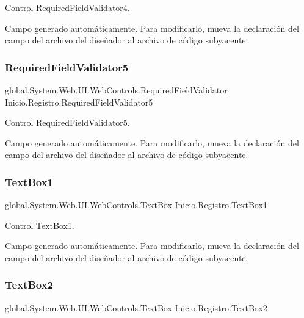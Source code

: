 Control Required\+Field\+Validator4. 

Campo generado automáticamente. Para modificarlo, mueva la declaración del campo del archivo del diseñador al archivo de código subyacente. \mbox{\label{class_inicio_1_1_registro_af4f83864caf67319997d2b41fb4298b2}} 
\subsubsection{\texorpdfstring{RequiredFieldValidator5}{RequiredFieldValidator5}}
{\footnotesize\ttfamily global.\+System.\+Web.\+U\+I.\+Web\+Controls.\+Required\+Field\+Validator Inicio.\+Registro.\+Required\+Field\+Validator5\hspace{0.3cm}{\ttfamily [protected]}}



Control Required\+Field\+Validator5. 

Campo generado automáticamente. Para modificarlo, mueva la declaración del campo del archivo del diseñador al archivo de código subyacente. \mbox{\label{class_inicio_1_1_registro_ab767617adc8dcd13a78c70824d55eb24}} 
\subsubsection{\texorpdfstring{TextBox1}{TextBox1}}
{\footnotesize\ttfamily global.\+System.\+Web.\+U\+I.\+Web\+Controls.\+Text\+Box Inicio.\+Registro.\+Text\+Box1\hspace{0.3cm}{\ttfamily [protected]}}



Control Text\+Box1. 

Campo generado automáticamente. Para modificarlo, mueva la declaración del campo del archivo del diseñador al archivo de código subyacente. \mbox{\label{class_inicio_1_1_registro_a24be4248d4791f6b323568f814f5e5c2}} 
\subsubsection{\texorpdfstring{TextBox2}{TextBox2}}
{\footnotesize\ttfamily global.\+System.\+Web.\+U\+I.\+Web\+Controls.\+Text\+Box Inicio.\+Registro.\+Text\+Box2\hspace{0.3cm}{\ttfamily [protected]}}



